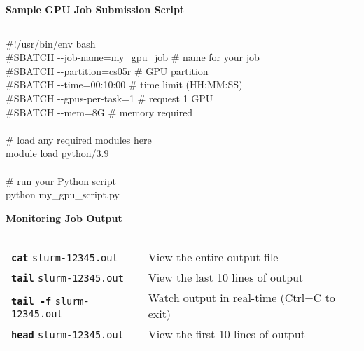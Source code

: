 \documentclass[11pt, a4paper, landscape]{article}
\newcommand{\slcmd}[1]{\textcolor{mainblue}{\texttt{\textbf{#1}}}}
\newcommand{\slopt}[1]{\textcolor{optiongreen}{\texttt{#1}}}
\begin{document}
\begin{tcolorbox}[colback=white, colframe=bordercolor, boxrule=1pt, arc=5mm, left=4mm, right=4mm, top=4mm, bottom=4mm]
\textbf{\large Sample GPU Job Submission Script}\\[-3mm]
\textcolor{mainblue}{\rule{\dimexpr\linewidth-8mm\relax}{2pt}}
\vspace{2mm}

\begin{tcolorbox}[colback=lightgray!50, colframe=bordercolor!70, boxrule=2pt, arc=4mm, left=3mm, right=3mm, top=2mm, bottom=2mm]
\small\ttfamily
\begin{tabbing}
\#!/usr/bin/env bash\\
\#SBATCH -{}-job-name=my\_gpu\_job \hspace{8mm} \= \# name for your job\\
\#SBATCH -{}-partition=cs05r \> \# GPU partition\\
\#SBATCH -{}-time=00:10:00 \> \# time limit (HH:MM:SS)\\
\#SBATCH -{}-gpus-per-task=1 \> \# request 1 GPU\\
\#SBATCH -{}-mem=8G \> \# memory required\\
\\
\# load any required modules here\\
module load python/3.9\\
\\
\# run your Python script\\
python my\_gpu\_script.py
\end{tabbing}
\end{tcolorbox}
\end{tcolorbox}

\vspace{3mm}

\begin{tcolorbox}[colback=white, colframe=bordercolor, boxrule=1pt, arc=5mm, left=4mm, right=4mm, top=4mm, bottom=4mm]
\textbf{\large Monitoring Job Output}\\[-3mm]
\textcolor{mainblue}{\rule{\dimexpr\linewidth-8mm\relax}{2pt}}
\vspace{2mm}

\small
\begin{tabular}{@{}p{}p{}@{}}
\slcmd{cat} \slopt{slurm-12345.out} & View the entire output file \\[1.5mm]
\slcmd{tail} \slopt{slurm-12345.out} & View the last 10 lines of output \\[1.5mm]
\slcmd{tail -f} \slopt{slurm-12345.out} & Watch output in real-time (Ctrl+C to exit) \\[1.5mm]
\slcmd{head} \slopt{slurm-12345.out} & View the first 10 lines of output \\
\end{tabular}
\end{tcolorbox}
\end{document}
